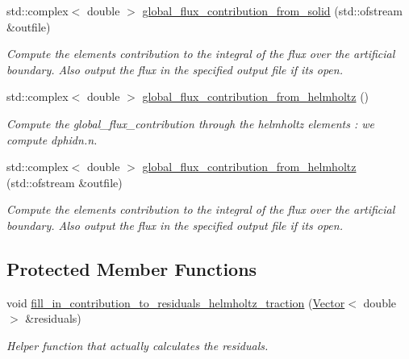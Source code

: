 \begin{DoxyCompactItemize}
std\+::complex$<$ double $>$ \hyperlink{classoomph_1_1TimeHarmonicLinElastLoadedByPMLHelmholtzPressureBCElement_a75389b4a8d6180adf372bff670383e31}{global\+\_\+flux\+\_\+contribution\+\_\+from\+\_\+solid} (std\+::ofstream \&outfile)
\begin{DoxyCompactList}\small\item\em Compute the element\textquotesingle{}s contribution to the integral of the flux over the artificial boundary. Also output the flux in the specified output file if it\textquotesingle{}s open. \end{DoxyCompactList}\item 
std\+::complex$<$ double $>$ \hyperlink{classoomph_1_1TimeHarmonicLinElastLoadedByPMLHelmholtzPressureBCElement_a341e0b3eb0cc1d15d65bd95c8d3244a7}{global\+\_\+flux\+\_\+contribution\+\_\+from\+\_\+helmholtz} ()
\begin{DoxyCompactList}\small\item\em Compute the global\+\_\+flux\+\_\+contribution through the helmholtz elements \+: we compute dphidn.\+n. \end{DoxyCompactList}\item 
std\+::complex$<$ double $>$ \hyperlink{classoomph_1_1TimeHarmonicLinElastLoadedByPMLHelmholtzPressureBCElement_a9848b595cc22cd7fca0c862bdf59cc85}{global\+\_\+flux\+\_\+contribution\+\_\+from\+\_\+helmholtz} (std\+::ofstream \&outfile)
\begin{DoxyCompactList}\small\item\em Compute the element\textquotesingle{}s contribution to the integral of the flux over the artificial boundary. Also output the flux in the specified output file if it\textquotesingle{}s open. \end{DoxyCompactList}\end{DoxyCompactItemize}
\subsection*{Protected Member Functions}
\begin{DoxyCompactItemize}
\item 
void \hyperlink{classoomph_1_1TimeHarmonicLinElastLoadedByPMLHelmholtzPressureBCElement_a7012451bb562db8a3c8c07542699f6c8}{fill\+\_\+in\+\_\+contribution\+\_\+to\+\_\+residuals\+\_\+helmholtz\+\_\+traction} (\hyperlink{classoomph_1_1Vector}{Vector}$<$ double $>$ \&residuals)
\begin{DoxyCompactList}\small\item\em Helper function that actually calculates the residuals. \end{DoxyCompactList}\end{DoxyCompactItemize}
